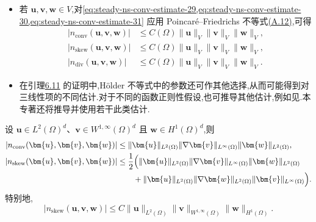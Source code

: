 \begin{note}[关于对流项]\label{note:steady-ns-convection-estimates-poincare}
\begin{itemize}
  \item 若 $\bm{u},\bm{v},\bm{w}\in V$,对\cref{eq:steady-ns-conv-estimate-29,eq:steady-ns-conv-estimate-30,eq:steady-ns-conv-estimate-31} 应用 Poincaré--Friedrichs 不等式\hyperref[eq:appendix-a-12]{(A.12)},可得
  \begin{align}
    |n_{\mathrm{conv}}(\bm{u},\bm{v},\bm{w})|
      &\le C(\Omega)\|\bm{u}\|_V\|\bm{v}\|_V\|\bm{w}\|_V,
        \label{eq:steady-ns-conv-estimate-35}\\
    |n_{\mathrm{skew}}(\bm{u},\bm{v},\bm{w})|
      &\le C(\Omega)\|\bm{u}\|_V\|\bm{v}\|_V\|\bm{w}\|_V,
        \label{eq:steady-ns-conv-estimate-36}\\
    |n_{\mathrm{div}}(\bm{u},\bm{v},\bm{w})|
      &\le C(\Omega)\|\bm{u}\|_V\|\bm{v}\|_V\|\bm{w}\|_V.
        \label{eq:steady-ns-conv-estimate-37}
  \end{align}
  \item 在引理\hyperref[lem:steady-ns-convection-estimates-1]{6.11} 的证明中,Hölder 不等式中的参数还可作其他选择,从而可能得到对三线性项的不同估计.对于不同的函数正则性假设,也可推导其他估计,例如见\textcite{LaytonTobiska1998}.本专著还将推导并使用若干此类估计.
\end{itemize}
\end{note}



\begin{lemma}[对流项的估计]\label{lem:steady-ns-convection-estimates-2}
设 $\bm{u}\in L^2(\Omega)^d$、$\bm{v}\in W^{1,\infty}(\Omega)^d$ 且 $\bm{w}\in H^1(\Omega)^d$,则
\begin{align}
  |n_{\mathrm{conv}}(\bm{u},\bm{v},\bm{w})|
    &\le\|\bm{u}\|_{L^2(\Omega)}
       \|\nabla\bm{v}\|_{L^\infty(\Omega)}
       \|\bm{w}\|_{L^2(\Omega)},
       \label{eq:steady-ns-conv-estimate-38}\\
  |n_{\mathrm{skew}}(\bm{u},\bm{v},\bm{w})|
    &\le\frac12\Bigl(
       \|\bm{u}\|_{L^2(\Omega)}
       \|\nabla\bm{v}\|_{L^\infty(\Omega)}
       \|\bm{w}\|_{L^2(\Omega)}\notag\\
       &\qquad+\|\bm{u}\|_{L^2(\Omega)}
        \|\nabla\bm{w}\|_{L^2(\Omega)}
        \|\bm{v}\|_{L^\infty(\Omega)}\Bigr).
       \label{eq:steady-ns-conv-estimate-39}
\end{align}
特别地,
\begin{equation}\label{eq:steady-ns-conv-estimate-40}
  |n_{\mathrm{skew}}(\bm{u},\bm{v},\bm{w})|
    \le C\|\bm{u}\|_{L^2(\Omega)}
       \|\bm{v}\|_{W^{1,\infty}(\Omega)}
       \|\bm{w}\|_{H^1(\Omega)}.
\end{equation}
\end{lemma}

